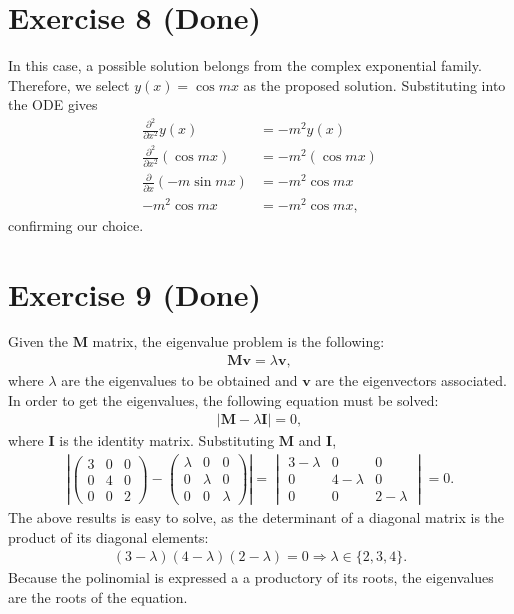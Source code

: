 \documentclass[letterpaper,11pt,twoside]{article}
\begin{document}
\section{Exercise 8 (Done)}
In this case, a possible solution belongs from the complex exponential family. Therefore, we select $y(x)=\cos mx$ as the proposed solution. 
Substituting into the ODE gives
\begin{align*}
  \frac{\partial^2}{\partial x^2}y(x)&=-m^2y(x)\\
  \frac{\partial^2}{\partial x^2}(\cos mx)&=-m^2(\cos mx)\\
  \frac{\partial}{\partial x}(-m\sin mx)&=-m^2\cos mx\\
  -m^2\cos mx&=-m^2\cos mx,
\end{align*}
confirming our choice.

\section{Exercise 9 (Done)}
Given the $\bm{M}$ matrix, the eigenvalue problem is the following:
\begin{align}
  \bm{M}\bm{v}=\lambda\bm{v},
\end{align}
where $\lambda$ are the eigenvalues to be obtained and $\bm{v}$ are the eigenvectors associated.
In order to get the eigenvalues, the following equation must be solved:
\begin{align}
  |\bm{M}-\lambda\bm{I}|=0,
\end{align}
where $\bm{I}$ is the identity matrix. Substituting $\bm{M}$ and $\bm{I}$,
\begin{align*}
  \left|\begin{pmatrix}
    3&0&0\\0&4&0\\0&0&2
  \end{pmatrix}-\begin{pmatrix}
    \lambda&0&0\\0&\lambda&0\\0&0&\lambda
  \end{pmatrix}\right|=\begin{vmatrix}
    3-\lambda&0&0\\0&4-\lambda&0\\0&0&2-\lambda
  \end{vmatrix}=0.
\end{align*}
The above results is easy to solve, as the determinant of a diagonal matrix is the product of its diagonal elements:
\begin{align}
  (3-\lambda)(4-\lambda)(2-\lambda)=0\Longrightarrow\lambda\in\{2,3,4\}.
\end{align}
Because the polinomial is expressed a a productory of its roots, the eigenvalues are the roots of the equation.
\end{document}
